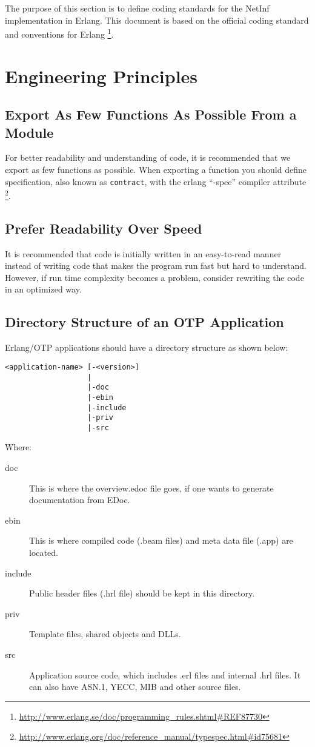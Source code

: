The purpose of this section is to define coding standards for the NetInf implementation in Erlang. This document is based on the official coding standard and conventions for Erlang \footnote{\url{http://www.erlang.se/doc/programming\_rules.shtml\#REF87730}}. 

\section{Engineering Principles}
\subsection{Export As Few Functions As Possible From a Module}
For better readability and understanding of code, it is recommended that we export as few functions as possible. When exporting a function you should define specification, also known as \texttt{contract}, with the erlang “-spec” compiler attribute \footnote{\url{http://www.erlang.org/doc/reference\_manual/typespec.html\#id75681}}. 

\subsection{Prefer Readability Over Speed}
It is recommended that code is initially written in an easy-to-read manner instead of writing code that makes the program run fast but hard to understand. However, if run time complexity becomes a problem, consider rewriting the code in an optimized way. 

\subsection{Directory Structure of an OTP Application}
Erlang/OTP applications should have a directory structure as shown below:
\begin{lstlisting}	
<application-name> [-<version>]
                   |
                   |-doc
                   |-ebin
                   |-include
                   |-priv
                   |-src
\end{lstlisting}
Where: 
\begin{description}
\item[doc] This is where the overview.edoc file goes, if one wants to generate documentation from EDoc. 
\item[ebin] This is where compiled code (.beam files) and meta data file (.app) are located.
\item[include] Public header files (.hrl file) should be kept in this directory.  
\item[priv] Template files, shared objects and DLLs. 
\item[src] Application source code, which includes .erl files and internal .hrl files. It can also have ASN.1, YECC, MIB and other source files.
\end{description}

